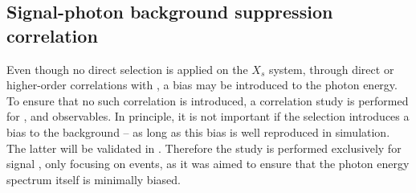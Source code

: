 \subsection{Signal-photon background suppression correlation}\label{sec:signal_photon_correlation}

Even though no direct selection is applied on the $X_s$ system, through direct or higher-order correlations with \EB, a bias may be introduced to the photon energy.
To ensure that no such correlation is introduced, a correlation study is performed for \piVeto, \etaVeto and \ZMVA observables.
In principle, it is not important if the selection introduces a bias to the background -- as long as this bias is well reproduced in simulation.
The latter will be validated in .
Therefore the study is performed exclusively for signal \MC, only focusing on \BtoXsgamma events, as it was aimed to ensure that the photon energy spectrum itself is minimally biased.

